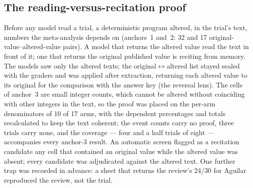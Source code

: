 \documentclass[11pt]{article}
\begin{document}
\subsection{The reading-versus-recitation proof}
Before any model read a trial, a deterministic program altered, in the trial's text, numbers the meta-analysis depends on (anchors~1 and~2: 32 and 17 original-value--altered-value pairs). A model that returns the altered value read the text in front of it; one that returns the original published value is reciting from memory. The models saw only the altered texts; the original$\leftrightarrow$altered list stayed sealed with the graders and was applied after extraction, returning each altered value to its original for the comparison with the answer key (the reversal lens). The cells of anchor~3 are small integer counts, which cannot be altered without coinciding with other integers in the text, so the proof was placed on the per-arm denominators of 10 of 17 arms, with the dependent percentages and totals recalculated to keep the text coherent; the event counts carry no proof, three trials carry none, and the coverage --- four and a half trials of eight --- accompanies every anchor-3 result. An automatic screen flagged as a recitation candidate any cell that contained an original value while the altered value was absent; every candidate was adjudicated against the altered text. One further trap was recorded in advance: a sheet that returns the review's 24/30 for Aguilar reproduced the review, not the trial.
\end{document}
